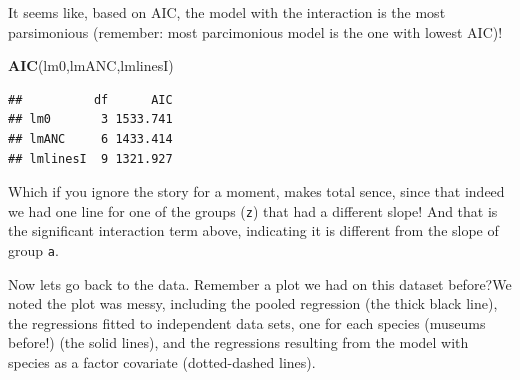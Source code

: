 \documentclass[
]{book}
\newenvironment{Shaded}{\begin{snugshade}}{\end{snugshade}}
\newcommand{\FunctionTok}[1]{\textcolor[rgb]{0.13,0.29,0.53}{\textbf{#1}}}
\newcommand{\NormalTok}[1]{#1}
\begin{document}
It seems like, based on AIC, the model with the interaction is the most parsimonious (remember: most parcimonious model is the one with lowest AIC)!

\begin{Shaded}
\begin{Highlighting}[]
\FunctionTok{AIC}\NormalTok{(lm0,lmANC,lmlinesI)}
\end{Highlighting}
\end{Shaded}

\begin{verbatim}
##          df      AIC
## lm0       3 1533.741
## lmANC     6 1433.414
## lmlinesI  9 1321.927
\end{verbatim}

Which if you ignore the story for a moment, makes total sence, since that indeed we had one line for one of the groups (\texttt{z}) that had a different slope! And that is the significant interaction term above, indicating it is different from the slope of group \texttt{a}.

Now lets go back to the data. Remember a plot we had on this dataset before?We noted the plot was messy, including the pooled regression (the thick black line), the regressions fitted to independent data sets, one for each species (museums before!) (the solid lines), and the regressions resulting from the model with species as a factor covariate (dotted-dashed lines).
\end{document}
